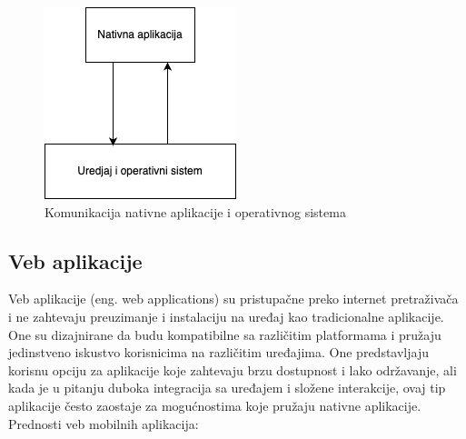 \documentclass[12pt,oneside]{memoir}
\begin{document}
\begin{figure}[h]
    \centering
    \includegraphics[scale=0.5]{docs/images/chapterTwo/nativnaAplikacija.png}
    \caption{Komunikacija nativne aplikacije i operativnog sistema}
    \label{fig:nativnaAplikacija}
\end{figure}

\subsection{Veb aplikacije}

Veb aplikacije (eng. web applications) su pristupačne preko internet pretraživača i ne zahtevaju preuzimanje i instalaciju na uređaj kao tradicionalne aplikacije. One su dizajnirane da budu kompatibilne sa različitim platformama i pružaju jedinstveno iskustvo korisnicima na različitim uređajima. One predstavljaju korisnu opciju za aplikacije koje zahtevaju brzu dostupnost i lako održavanje, ali kada je u pitanju duboka integracija sa uređajem i složene interakcije, ovaj tip aplikacije često zaostaje za mogućnostima koje pružaju nativne aplikacije. Prednosti veb mobilnih aplikacija:
\end{document}
